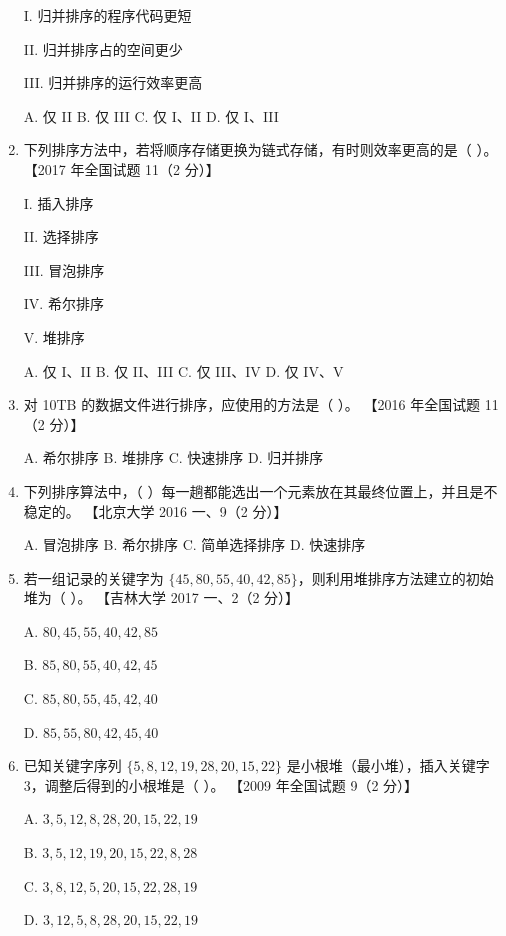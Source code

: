 \documentclass[lang=cn,newtx,10pt,scheme=chinese]{../../elegantbook}
\begin{document}
\begin{enumerate}
    I. 归并排序的程序代码更短  

    II. 归并排序占的空间更少  

    III. 归并排序的运行效率更高 

    A. 仅 II \quad B. 仅 III \quad C. 仅 I、II \quad D. 仅 I、III  

    \item 下列排序方法中，若将顺序存储更换为链式存储，有时则效率更高的是（ ）。  
    【2017 年全国试题 11（2 分）】  

    I. 插入排序  

    II. 选择排序  

    III. 冒泡排序  

    IV. 希尔排序  

    V. 堆排序  

    A. 仅 I、II \quad B. 仅 II、III \quad C. 仅 III、IV \quad D. 仅 IV、V  

    \item 对 10TB 的数据文件进行排序，应使用的方法是（ ）。  
    【2016 年全国试题 11（2 分）】  

    A. 希尔排序 \quad B. 堆排序 \quad C. 快速排序 \quad D. 归并排序  

    \item 下列排序算法中，（ ）每一趟都能选出一个元素放在其最终位置上，并且是不稳定的。  
    【北京大学 2016 一、9（2 分）】  

    A. 冒泡排序 \quad B. 希尔排序 \quad C. 简单选择排序 \quad D. 快速排序  

    \item 若一组记录的关键字为 $\{45, 80, 55, 40, 42, 85\}$，则利用堆排序方法建立的初始堆为（ ）。  
    【吉林大学 2017 一、2（2 分）】  

    A. $80, 45, 55, 40, 42, 85$  

    B. $85, 80, 55, 40, 42, 45$  

    C. $85, 80, 55, 45, 42, 40$  

    D. $85, 55, 80, 42, 45, 40$  

    \item 已知关键字序列 $\{5, 8, 12, 19, 28, 20, 15, 22\}$ 是小根堆（最小堆），插入关键字 3，调整后得到的小根堆是（ ）。  
    【2009 年全国试题 9（2 分）】  

    A. $3, 5, 12, 8, 28, 20, 15, 22, 19$  

    B. $3, 5, 12, 19, 20, 15, 22, 8, 28$  

    C. $3, 8, 12, 5, 20, 15, 22, 28, 19$  

    D. $3, 12, 5, 8, 28, 20, 15, 22, 19$  


\end{enumerate}
\end{document}
